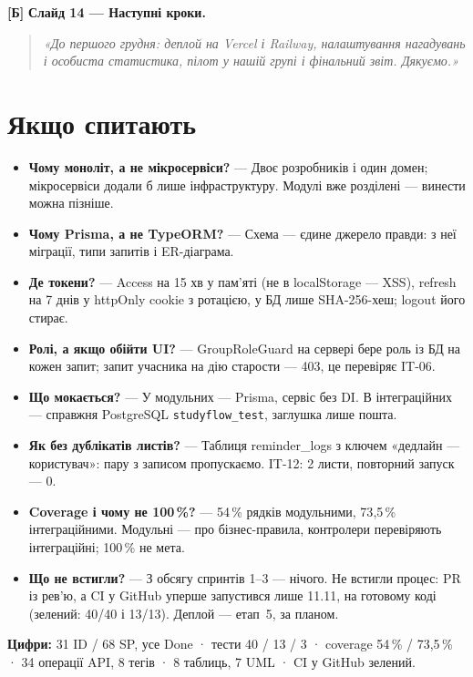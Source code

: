 \documentclass[11pt]{article}
\newcommand{\say}[1]{\begin{quote}\itshape «#1»\end{quote}}
\newcommand{\who}[1]{\textcolor{accent}{\textbf{[#1]}}}
\begin{document}
\who{Б} \textbf{Слайд 14 --- Наступні кроки.}
\say{До першого грудня: деплой на Vercel і Railway, налаштування нагадувань і особиста статистика, пілот у нашій групі і фінальний звіт. Дякуємо.}

\section*{Якщо спитають}
\begin{itemize}[leftmargin=1.2em,itemsep=2pt]
  \item \textbf{Чому моноліт, а не мікросервіси?} --- Двоє розробників і один домен; мікросервіси додали б лише інфраструктуру. Модулі вже розділені --- винести можна пізніше.
  \item \textbf{Чому Prisma, а не TypeORM?} --- Схема --- єдине джерело правди: з неї міграції, типи запитів і ER-діаграма.
  \item \textbf{Де токени?} --- Access на 15 хв у пам'яті (не в localStorage --- XSS), refresh на 7 днів у httpOnly cookie з ротацією, у БД лише SHA-256-хеш; logout його стирає.
  \item \textbf{Ролі, а якщо обійти UI?} --- GroupRoleGuard на сервері бере роль із БД на кожен запит; запит учасника на дію старости --- 403, це перевіряє IT-06.
  \item \textbf{Що мокається?} --- У модульних --- Prisma, сервіс без DI. В інтеграційних --- справжня PostgreSQL \texttt{studyflow\_test}, заглушка лише пошта.
  \item \textbf{Як без дублікатів листів?} --- Таблиця reminder\_logs з ключем «дедлайн --- користувач»: пару з записом пропускаємо. IT-12: 2 листи, повторний запуск --- 0.
  \item \textbf{Coverage і чому не 100\,\%?} --- 54\,\% рядків модульними, 73{,}5\,\% інтеграційними. Модульні --- про бізнес-правила, контролери перевіряють інтеграційні; 100\,\% не мета.
  \item \textbf{Що не встигли?} --- З обсягу спринтів 1--3 --- нічого. Не встигли процес: PR із рев'ю, а CI у GitHub уперше запустився лише 11.11, на готовому коді (зелений: 40/40 і 13/13). Деплой --- етап~5, за планом.
\end{itemize}

\textbf{Цифри:} 31 ID / 68 SP, усе Done · тести 40 / 13 / 3 · coverage 54\,\% / 73{,}5\,\% · 34 операції API, 8 тегів · 8 таблиць, 7 UML · CI у GitHub зелений.
\end{document}
